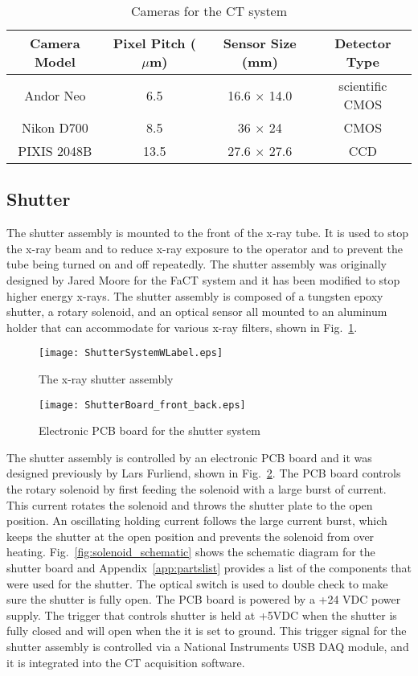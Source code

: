 \begin{table}[h]
\begin{tabular}{c|c|c|c}
\hline
Camera Model & Pixel Pitch ($\mu$m) & Sensor Size (mm) & Detector Type \\ \hline
Andor Neo & 6.5 & 16.6 $\times$ 14.0 & scientific CMOS \\ \hline
Nikon D700 & 8.5 & 36 $\times$ 24 & CMOS \\ \hline
PIXIS 2048B & 13.5 & 27.6 $\times$ 27.6 & CCD \\
\hline
\end{tabular}
\caption{Cameras for the CT system}
\label{table:cameras}
\end{table}

\subsection{Shutter}
The shutter assembly is mounted to the front of the x-ray tube. It is used to stop the x-ray beam and to reduce x-ray exposure to the operator and to prevent the tube being turned on and off repeatedly.  The shutter assembly was originally designed by Jared Moore for the FaCT system and it has been modified to stop higher energy x-rays.  The shutter assembly is composed of a tungsten epoxy shutter, a rotary solenoid, and an optical sensor all mounted to an aluminum holder that can accommodate for various x-ray filters, shown in Fig.~\ref{fig:shutter}.

\begin{figure}[h]
\centering
	\texttt{[image: ShutterSystemWLabel.eps]}
	\caption{The x-ray shutter assembly}
	\label{fig:shutter}
\end{figure}

\begin{figure}
\centering
\texttt{[image: ShutterBoard\_front\_back.eps]}
\caption{Electronic PCB board for the shutter system}
\label{fig:shutterboard}
\end{figure}

The shutter assembly is controlled by an electronic PCB board and it was designed previously by Lars Furliend, shown in Fig.~\ref{fig:shutterboard}.  The PCB board controls the rotary solenoid by first feeding the solenoid with a large burst of current.  This current rotates the solenoid and throws the shutter plate to the open position.  An oscillating holding current follows the large current burst, which keeps the shutter at the open position and prevents the solenoid from over heating.  Fig.~\ref{fig:solenoid_schematic} shows the schematic diagram for the shutter board and Appendix~\ref{app:partslist} provides a list of the components that were used for the shutter.  The optical switch is used to double check to make sure the shutter is fully open.  The PCB board is powered by a +24 VDC power supply.  The trigger that controls shutter is held at +5VDC when the shutter is fully closed and will open when the it is set to ground.  This trigger signal for the shutter assembly is controlled via a National Instruments USB DAQ module, and it is integrated into the CT acquisition software.

